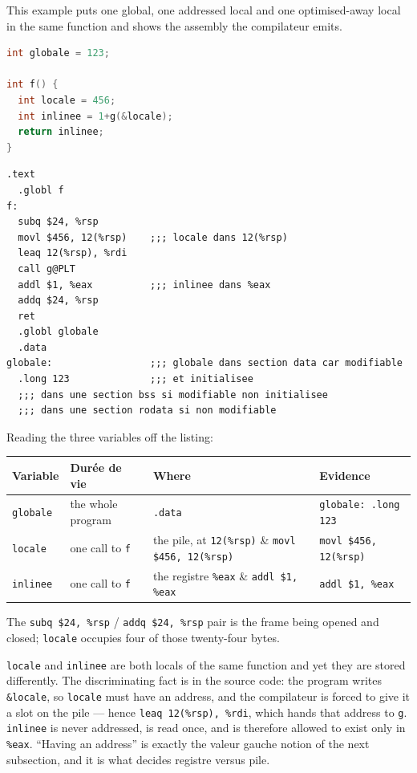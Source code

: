 \begin{example}
  This example puts one global, one addressed local and one optimised-away
  local in the same function and shows the assembly the compilateur emits.
  \begin{lstlisting}[language=C]
int globale = 123;

int f() {
  int locale = 456;
  int inlinee = 1+g(&locale);
  return inlinee;
}
  \end{lstlisting}
  \begin{lstlisting}[language=gas]
  .text
  .globl f
f:
  subq $24, %rsp
  movl $456, 12(%rsp)    ;;; locale dans 12(%rsp)
  leaq 12(%rsp), %rdi
  call g@PLT
  addl $1, %eax          ;;; inlinee dans %eax
  addq $24, %rsp
  ret
  .globl globale
  .data
globale:                 ;;; globale dans section data car modifiable
  .long 123              ;;; et initialisee
  ;;; dans une section bss si modifiable non initialisee
  ;;; dans une section rodata si non modifiable
  \end{lstlisting}
  Reading the three variables off the listing:
  \begin{center}
  \begin{tabular}{llll}
    \toprule
    Variable & Durée de vie & Where & Evidence \\
    \midrule
    \verb|globale| & the whole program & \verb|.data| & \verb|globale: .long 123| \\
    \verb|locale|  & one call to \verb|f| & the pile, at \verb|12(%rsp)| & \verb|movl $456, 12(%rsp)| \\
    \verb|inlinee| & one call to \verb|f| & the registre \verb|%eax| & \verb|addl $1, %eax| \\
    \bottomrule
  \end{tabular}
  \end{center}
  The \verb|subq $24, %rsp| / \verb|addq $24, %rsp| pair is the frame being
  opened and closed; \verb|locale| occupies four of those twenty-four bytes.
\end{example}

\begin{remark}
  \verb|locale| and \verb|inlinee| are both locals of the same function and yet
  they are stored differently. The discriminating fact is in the source code: the
  program writes \verb|&locale|, so \verb|locale| must have an address, and the
  compilateur is forced to give it a slot on the pile --- hence
  \verb|leaq 12(%rsp), %rdi|, which hands that address to \verb|g|.
  \verb|inlinee| is never addressed, is read once, and is therefore allowed to
  exist only in \verb|%eax|. ``Having an address'' is exactly the valeur gauche
  notion of the next subsection, and it is what decides registre versus pile.
\end{remark}

